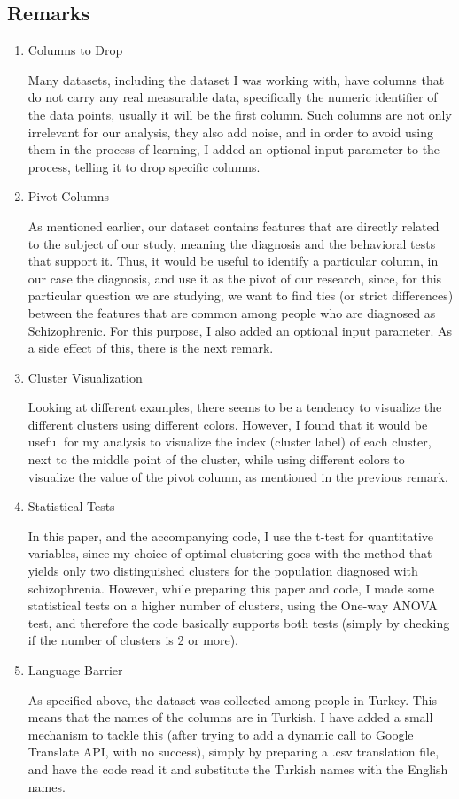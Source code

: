 \documentclass{article}
\begin{document}
\subsection{Remarks}
\begin{enumerate}
    \item Columns to Drop

    Many datasets, including the dataset I was working with, have columns that do not carry any real measurable data, specifically the numeric identifier of the data points, usually it will be the first column. Such columns are not only irrelevant for our analysis, they also add noise, and in order to avoid using them in the process of learning, I added an optional input parameter to the process, telling it to drop specific columns.
    \item Pivot Columns

    As mentioned earlier, our dataset contains features that are directly related to the subject of our study, meaning the diagnosis and the behavioral tests that support it. Thus, it would be useful to identify a particular column, in our case the diagnosis, and use it as the pivot of our research, since, for this particular question we are studying, we want to find ties (or strict differences) between the features that are common among people who are diagnosed as Schizophrenic. For this purpose, I also added an optional input parameter. As a side effect of this, there is the next remark.

    \item Cluster Visualization

    Looking at different examples, there seems to be a tendency to visualize the different clusters using different colors. However, I found that it would be useful for my analysis to visualize the index (cluster label) of each cluster, next to the middle point of the cluster, while using different colors to visualize the value of the pivot column, as mentioned in the previous remark.

    \item Statistical Tests
    
    In this paper, and the accompanying code, I use the t-test for quantitative variables, since my choice of optimal clustering goes with the method that yields only two distinguished clusters for the population diagnosed with schizophrenia. However, while preparing this paper and code, I made some statistical tests on a higher number of clusters, using the One-way ANOVA test, and therefore the code basically supports both tests (simply by checking if the number of clusters is 2 or more).

    \item Language Barrier
    
    As specified above, the dataset was collected among people in Turkey. This means that the names of the columns are in Turkish. I have added a small mechanism to tackle this (after trying to add a dynamic call to Google Translate API, with no success), simply by preparing a .csv translation file, and have the code read it and substitute the Turkish names with the English names.
\end{enumerate}
\end{document}
